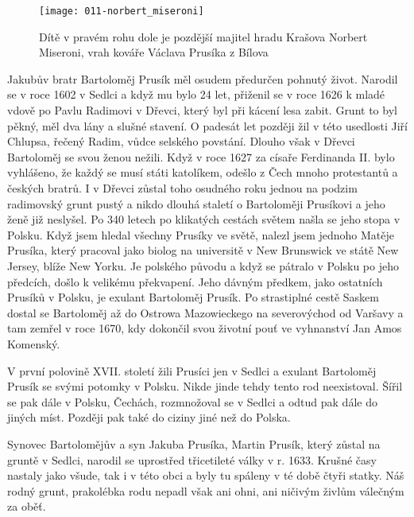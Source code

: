 \documentclass[../dejiny-rodu-prusiku.tex]{subfiles}
\begin{document}

\begin{figure}
\centering
\texttt{[image: 011-norbert\_miseroni]}
\caption{Dítě v pravém rohu dole je pozdější majitel hradu Krašova Norbert Miseroni, vrah kováře Václava Prusíka z Bílova}
\label{fig:011-nobert_miseroni}
\end{figure}


Jakubův bratr Bartoloměj Prusík měl osudem předurčen pohnutý život. Narodil se v roce 1602 v Sedlci a když mu bylo 24 let, přiženil se v roce 1626 k mladé vdově po Pavlu Radimovi v Dřevci, který byl při kácení lesa zabit. Grunt to byl pěkný, měl dva lány a slušné stavení. O padesát let později žil v této usedlosti Jiří Chlupsa, řečený Radim, vůdce selského povstání. Dlouho však v Dřevci Bartoloměj se svou že­nou nežili. Když v roce 1627 za císaře Ferdinanda II. bylo vyhlášeno, že každý se musí státi katolíkem, ode­šlo z Čech mnoho protestantů a českých bratrů. I v Dřevci zůstal toho osudného roku jednou na podzim radimovský grunt pustý a nikdo dlouhá staletí o Barto­loměji Prusíkovi a jeho ženě již neslyšel. Po 340 letech po klikatých cestách světem našla se jeho stopa v Pol­sku. Když jsem hledal všechny Prusíky ve světě, nalezl jsem jednoho Matěje Prusíka, který pracoval jako bio­log na universitě v New Brunswick ve státě New Jersey, blíže New Yorku. Je polského původu a když se pátralo v Polsku po jeho předcích, došlo k velikému překvapení. Jeho dávným předkem, jako ostatních Prusíků v Polsku, je exulant Bartoloměj Prusík. Po strastiplné cestě Saskem dostal se Bartoloměj až do Ostrowa Mazowieckego na se­verovýchod od Varšavy a tam zemřel v roce 1670, kdy do­končil svou životní pouť ve vyhnanství Jan Amos Komen­ský.

V první polovině XVII. století žili Prusíci jen v Sedlci a exulant Bartoloměj Prusík se svými potomky v Polsku. Nikde jinde tehdy tento rod neexistoval. Šířil se pak dále v Polsku, Čechách, rozmnožoval se v Sedlci a odtud pak dále do jiných míst. Později pak také do ciziny ji­né než do Polska.

Synovec Bartolomějův a syn Jakuba Prusíka, Martin Pru­sík, který zůstal na gruntě v Sedlci, narodil se uprostřed třicetileté války v r. 1633. Krušné časy nastaly jako všude, tak i v této obci a byly tu spáleny v té době čty­ři statky. Náš rodný grunt, prakolébka rodu nepadl však ani ohni, ani ničivým živlům válečným za oběť.
\end{document}
